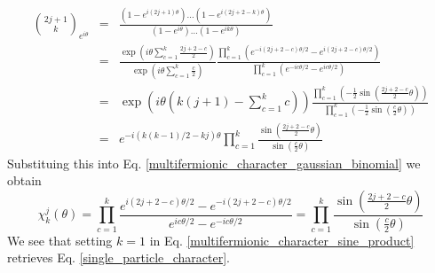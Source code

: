 \documentclass[12pt]{article}
\begin{document}
	\begin{eqnarray*}
	{2j+1\choose k}_{e^{i\theta}}&=&\frac{\left(1-e^{i(2j+1)\theta}\right)\dots \left(1-e^{i(2j+2-k)\theta}\right)}{\left(1-e^{i\theta}\right)\dots \left(1-e^{ik\theta}\right)}\\
	&=& \frac{\exp(i\theta\sum_{c=1}^k\frac{2j+2-c}{2})}{\exp(i\theta\sum_{c=1}^k\frac{c}{2})}\frac{\prod_{c=1}^k\left(e^{-i(2j+2-c)\theta/2}-e^{i(2j+2-c)\theta/2}\right)}{\prod_{c=1}^k\left(e^{-ic\theta/2}-e^{ic\theta/2}\right)}\\
	&=& \exp(i\theta \left(k(j+1)-\sum_{c=1}^k c\right)) \frac{\prod_{c=1}^k \left(-\frac{1}{2}\sin(\frac{2j+2-c}{2}\theta)\right)}{\prod_{c=1}^k\left(-\frac{1}{2}\sin(\frac{c}{2}\theta)\right)}\\
	&=& e^{-i\left(k(k-1)/2-kj\right)\theta}\prod_{c=1}^k \frac{\sin(\frac{2j+2-c}{2}\theta)}{\sin(\frac{c}{2}\theta)}
	\end{eqnarray*}
	Substituing this into Eq. \ref{multifermionic_character_gaussian_binomial} we obtain
	\begin{equation} \label{multifermionic_character_sine_product}
	\chi^j_k(\theta) = \prod_{c=1}^k\frac{e^{i(2j+2-c)\theta/2}-e^{-i(2j+2-c)\theta/2}}{e^{ic\theta/2}-e^{-ic\theta/2}} = \prod_{c=1}^k \frac{\sin(\frac{2j+2-c}{2}\theta)}{\sin(\frac{c}{2}\theta)}
	\end{equation}
	We see that setting $k=1$ in Eq. \ref{multifermionic_character_sine_product} retrieves Eq. \ref{single_particle_character}.
	
\end{document}
